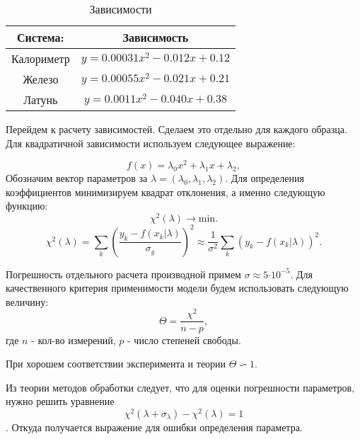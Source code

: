 \documentclass[12pt,a4paper]{article}
\newcommand{\e}[1]{\text{$\cdot10^{#1}$}}
\begin{document}
 
 \begin{table}
 	\centering
 	\caption{Зависимости}
 	\label{tab:lin}
 	\footnotesize
 	\begin{tabular}{|c|c|}
 		
 		\hline
 		Система:   & Зависимость  \\ \hline
 		Калориметр &  $y = 0.00031x^2 -0.012x+  0.12$ \\ \hline
 		Железо     &  $y = 0.00055x^2 -0.021x + 0.21$ \\ \hline
 		Латунь     &  $y = 0.0011x^2 -0.040x+ 0.38$ \\ \hline
 		
 	\end{tabular}
 	
 \end{table}


Перейдем к расчету зависимостей. Сделаем это отдельно для каждого образца. Для квадратичной зависимости используем следующее выражение:

$$f(x) = \lambda_0x^2 + \lambda_1x + \lambda_2,$$
Обозначим вектор параметров за $\lambda = (\lambda_0, \lambda_1, \lambda_2)$.
Для определения коэффициентов минимизируем квадрат отклонения, а именно следующую функцию:
$$\chi^2(\lambda) \rightarrow \text{min}.$$
$$\chi^2(\lambda) = \sum_k{\left(\frac{y_k - f(x_k| \lambda)}{\sigma_y}\right)^2} \approx \frac{1}{\sigma^2}\sum_k{\left(y_k - f(x_k | \lambda)\right)^2}.$$

Погрешность отдельного расчета производной примем $\sigma \approx 5\e{-5}$.
Для качественного критерия применимости модели будем использовать следующую величину:
$$\Theta = \frac{\chi^2}{n - p},$$
где $n$ - кол-во измерений,
	$p$ - число степеней свободы.
	
При хорошем соответствии эксперимента и теории $\Theta \backsim 1$.	
	
Из теории методов обработки следует, что для оценки погрешности параметров, нужно решить уравнение 
$$\chi^2(\lambda + \sigma_{\lambda}) - \chi^2(\lambda) = 1$$.
Откуда получается выражение для ошибки определения параметра.
\end{document}
